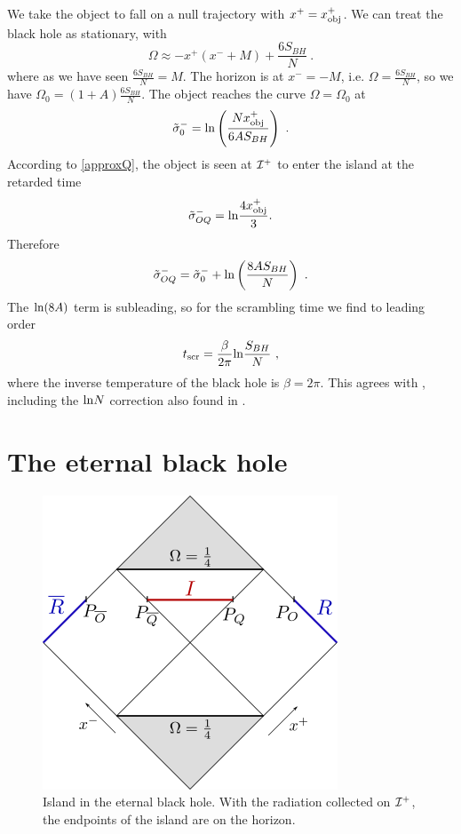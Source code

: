 \documentclass[12pt,oneside,letterpaper]{article}
\newcommand{\be}{\begin{equation}}
\newcommand{\ee}{\end{equation}}
\def\be{\begin{eqnarray}}
\def\ee{\end{eqnarray}}
\def\be{\begin{equation}}
\def\ee{\end{equation}}
\def\m{{M}}
\def\log{{\rm ln}}
\numberwithin{equation}{section}
\def \be {\begin{equation}}
\def \ee {\end{equation}}
\begin{document}
We take the object to fall on a null trajectory with $x^+ = x^+_{\rm obj}$. We can treat the black hole as stationary, with
\be
\Omega \approx -  x^+ (x^-+M) + \frac{6S_{BH}}{N} \ .
\ee
where as we have seen $\frac{6S_{BH}}{N}=\m$.  The horizon is at $x^-=-M$, i.e. $\Omega = \frac{6S_{BH}}{N}$, so we have $\Omega_0 = (1+A)\frac{6S_{BH}}{N}$.   The object reaches the curve $\Omega = \Omega_0$  at 
\be
\tsigma^-_0 =  \log \left( \frac{N  x_{\rm obj}^+}{6A S_{BH}} \right) \ .
\ee
According to \eqref{approxQ}, the object is seen at ${\cal I}^+$ to enter the island at the retarded time 
\be
 { \tsigma^-_{OQ}}=\log \frac{4x^+_{\rm obj}}{3}.
\ee
Therefore 
\be
\tsigma^-_{OQ} = \tsigma_0^- + \log\left( \frac{8AS_{BH}}{N} \right) \ .
\ee
The $\log(8A)$ term is subleading, so for the scrambling time we find to leading order 
\be
t_{\rm scr} = \frac{\beta}{2\pi}\log \frac{S_{BH}}{N} \ ,
\ee
where the inverse temperature of the black hole is $\beta ={2\pi}{}$. This agrees with \cite{Hayden:2007cs,Sekino:2008he}, including the $\log N$ correction also found in \cite{Penington:2019npb}.





\section{The eternal black hole}
\begin{figure}
\begin{center}
\includegraphics[scale=1.0]{figures/eternalBH.png}
\end{center}
\caption{\small Island in the eternal black hole. With the radiation collected on ${\cal I}^+$, the endpoints of the island are on the horizon. \label{fig:eternalBH}}
\end{figure}
\end{document}
